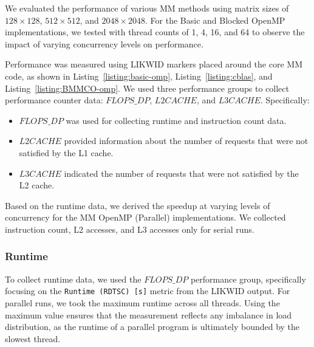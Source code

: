

We evaluated the performance of various MM methods using matrix sizes of \(128 \times 128\), \(512 \times 512\), and \(2048 \times 2048\). For the Basic and Blocked OpenMP implementations, we tested with thread counts of 1, 4, 16, and 64 to observe the impact of varying concurrency levels on performance.

Performance was measured using LIKWID markers placed around the core MM code, as shown in Listing~\ref{listing:basic-omp}, Listing~\ref{listing:cblas}, and Listing~\ref{listing:BMMCO-omp}. We used three performance groups to collect performance counter data: \(FLOPS\_DP\), \(L2CACHE\), and \(L3CACHE\). Specifically:
\begin{itemize}
    \item \(FLOPS\_DP\) was used for collecting runtime and instruction count data.
    \item \(L2CACHE\) provided information about the number of requests that were not satisfied by the L1 cache.
    \item \(L3CACHE\) indicated the number of requests that were not satisfied by the L2 cache.
\end{itemize}
Based on the runtime data, we derived the speedup at varying levels of concurrency for the MM OpenMP (Parallel) implementations. We collected instruction count, L2 accesses, and L3 accesses only for serial runs.

\subsubsection{Runtime}
\label{subsubsec:runtime}
To collect runtime data, we used the \(FLOPS\_DP\) performance group, specifically focusing on the \texttt{Runtime (RDTSC) [s]} metric from the LIKWID output. For parallel runs, we took the maximum runtime across all threads. Using the maximum value ensures that the measurement reflects any imbalance in load distribution, as the runtime of a parallel program is ultimately bounded by the slowest thread.

